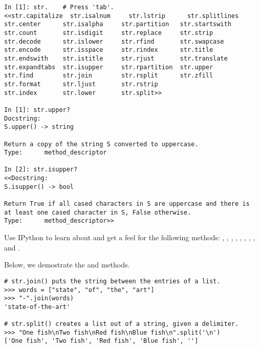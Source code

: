 \begin{lstlisting}
In [1]: str.    # Press 'tab'.
<<str.capitalize  str.isalnum     str.lstrip      str.splitlines
str.center      str.isalpha     str.partition   str.startswith
str.count       str.isdigit     str.replace     str.strip
str.decode      str.islower     str.rfind       str.swapcase
str.encode      str.isspace     str.rindex      str.title
str.endswith    str.istitle     str.rjust       str.translate
str.expandtabs  str.isupper     str.rpartition  str.upper
str.find        str.join        str.rsplit      str.zfill
str.format      str.ljust       str.rstrip      
str.index       str.lower       str.split>>

In [1]: str.upper?
Docstring:
S.upper() -> string

Return a copy of the string S converted to uppercase.
Type:      method_descriptor

In [2]: str.isupper?
<<Docstring:
S.isupper() -> bool

Return True if all cased characters in S are uppercase and there is
at least one cased character in S, False otherwise.
Type:      method_descriptor>>
\end{lstlisting}

Use IPython to learn about and get a feel for the following  methods: , , , , , , , , and .

Below, we demostrate the  and  methods.

\begin{lstlisting}
# str.join() puts the string between the entries of a list.
>>> words = ["state", "of", "the", "art"]
>>> "-".join(words)
'state-of-the-art'

# str.split() creates a list out of a string, given a delimiter.
>>> "One fish\nTwo fish\nRed fish\nBlue fish\n".split('\n')
['One fish', 'Two fish', 'Red fish', 'Blue fish', '']
\end{lstlisting}

